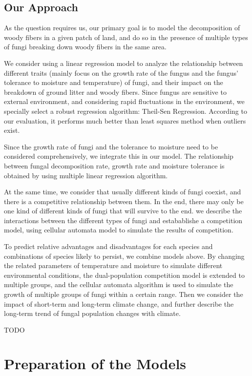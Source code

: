 \documentclass{mcmthesis}
\begin{document}
\subsection{Our Approach}

As the question requires us, our primary goal is to model the decomposition of woody fibers in a given patch of land, and do so in the presence of multiple types of fungi breaking down woody fibers in the same area.

We consider using a linear regression model to analyze the relationship between different traits (mainly focus on the growth rate of the fungus and the fungus' tolerance to moisture and temperature) of fungi, and their impact on the breakdown of ground litter and woody fibers. Since fungus are sensitive to external environment, and considering rapid fluctuations in the environment, we specially select a robust regression algorithm: Theil-Sen Regression. According to our evaluation, it performs much better than least squares method when outliers exist.

Since the growth rate of fungi and the tolerance to moisture need to be considered comprehensively, we integrate this in our model. The relationship between fungal decomposition rate, growth rate and moisture tolerance is obtained by using multiple linear regression algorithm. 

At the same time, we consider that usually different kinds of fungi coexist, and there is a competitive relationship between them. In the end, there may only be one kind of different kinds of fungi that will survive to the end. we describe the interactions between the different types of fungi and estabablishe a competition model, using cellular automata model to simulate the results of competition.

To predict relative advantages and disadvantages for each species and combinations of species likely to persist, we combine models above. By changing the related parameters of temperature and moisture to simulate different environmental conditions, the dual-population competition model is extended to multiple groups, and the cellular automata algorithm is used to simulate the growth of multiple groups of fungi within a certain range. Then we consider the impact of short-term and long-term climate change, and further describe the long-term trend of fungal population changes with climate. 

TODO

\section{Preparation of the Models}
\end{document}
